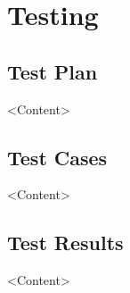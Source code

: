 \chapter{Testing}


\section{Test Plan}
<Content>

\section{Test Cases}
<Content>

\section{Test Results}
<Content>